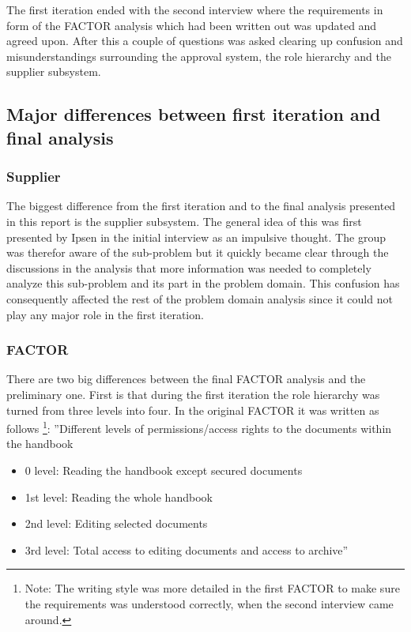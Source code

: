 The first iteration ended with the second interview where the requirements in form of the FACTOR analysis which had been written out was updated and agreed upon.
After this a couple of questions was asked clearing up confusion and misunderstandings surrounding the approval system, the role hierarchy and the supplier subsystem.

\subsection{Major differences between first iteration and final analysis}
\subsubsection*{Supplier} 
The biggest difference from the first iteration and to the final analysis presented in this report is the supplier subsystem.
The general idea of this was first presented by Ipsen in the initial interview as an impulsive thought. 
The group was therefor aware of the sub-problem but it quickly became clear through the discussions in the analysis that more information was needed to completely analyze this sub-problem and its part in the problem domain.
This confusion has consequently affected the rest of the problem domain analysis since it could not play any major role in the first iteration.

\subsubsection*{FACTOR}
There are two big differences between the final FACTOR analysis and the preliminary one.
First is that during the first iteration the role hierarchy was turned from three levels into four. 
In the original FACTOR it was written as follows
\footnote{Note: The writing style was more detailed in the first FACTOR to make sure the requirements was understood correctly, when the second interview came around.}:
\newline
''Different levels of permissions/access rights to the documents within the handbook
\begin{itemize}
	\item 
	0 level:
	Reading the handbook except secured documents
	\item 
	1st level:
	Reading the whole handbook
	\item 
	2nd level:
	Editing selected documents
	\item 
	3rd level:
	Total access to editing documents and access to archive''
\end{itemize}

